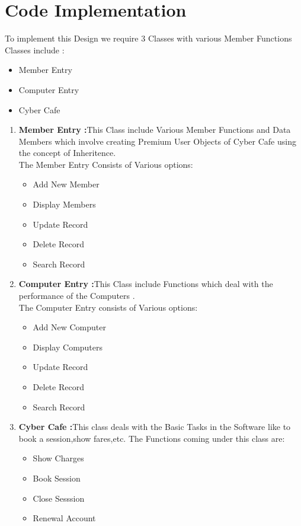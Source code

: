 \documentclass[12pt]{article}
\begin{document}
\section{Code Implementation}
\vspace{3mm}
\noindent To implement this Design we require 3 Classes with various Member Functions
Classes include :
\begin{itemize}
    \item Member Entry
    \item Computer Entry
    \item Cyber Cafe
\end{itemize}
\vspace{3mm}
     \begin{enumerate}
        \item \textbf{Member Entry :}This Class include Various Member Functions and Data Members which involve creating Premium User Objects of Cyber Cafe using the concept of Inheritence.\\
        The Member Entry Consists of Various options:
        \begin{itemize}
            \item  Add New Member
            \item Display Members
            \item Update Record
            \item Delete Record
            \item Search Record
        \end{itemize}
        \item \textbf{Computer Entry :}This Class include Functions which deal with the performance of the Computers .\\
        The Computer Entry consists of Various options:
        \begin{itemize}
            \item Add New Computer
            \item Display Computers
            \item Update Record
            \item Delete Record
            \item Search Record
        \end{itemize}
        \item \textbf{Cyber Cafe :}This class deals with the Basic Tasks in the Software like to book a session,show fares,etc.
        The Functions coming under this class are:
        \begin{itemize}
            \item Show Charges
            \item Book Session
            \item Close Sesssion
            \item Renewal Account

        \end{itemize}
        

        
        
        
     \end{enumerate}
    
\end{document}
